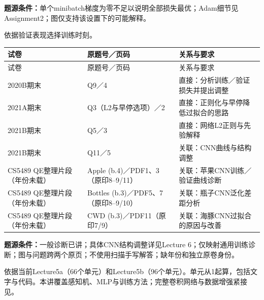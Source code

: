 \textbf{题源条件：}单个minibatch梯度为零不足以说明全部损失最优；Adam细节见Assignment2；图仅支持该设置下的可能解释。



依据验证表现选择训练时刻。

\begingroup\small\setlength{\tabcolsep}{3pt}\renewcommand{\arraystretch}{1.22}
\begin{longtable}{@{}>{\raggedright\arraybackslash}p{}>{\raggedright\arraybackslash}p{}>{\raggedright\arraybackslash}p{}@{}}
\toprule
试卷 & 原题号／页码 & 关系与要求 \\
\midrule\endfirsthead
试卷 & 原题号／页码 & 关系与要求 \\
\midrule\endhead
\bottomrule\endfoot
2020B期末 & Q9／4 & 直接：分析训练／验证损失并提出调整 \\
2021A期末 & Q3（L2与早停选项）／2 & 直接：正则化与早停降低过拟合的思路 \\
2021B期末 & Q5／3 & 直接：网络L2正则与先验解释 \\
2021B期末 & Q11／5 & 关联：CNN曲线与结构调整 \\
CS5489 QE整理片段（年份未载） & Apple (b.4)／PDF1、3（原印8–9/11） & 关联：苹果CNN训练／验证曲线诊断 \\
CS5489 QE整理片段（年份未载） & Bottles (b.3)／PDF5、7（原印8–9/10） & 关联：瓶子CNN泛化差距分析 \\
CS5489 QE整理片段（年份未载） & CWD (b.3)／PDF11（原印7/9） & 关联：海豚CNN过拟合的原因与改善 \\
\end{longtable}\endgroup

\textbf{题源条件：}一般诊断已讲；具体CNN结构调整详见Lecture 6；仅映射通用训练诊断；图与问题跨两个原页；不使用扫描手写解答；缺年份和独立原卷身份。







依据当前Lecture5a（66个单元）和Lecture5b（96个单元）。单元从1起算，包括文字与代码。本讲覆盖感知机、MLP与训练方法；完整卷积网络与数据增强紧接见。



